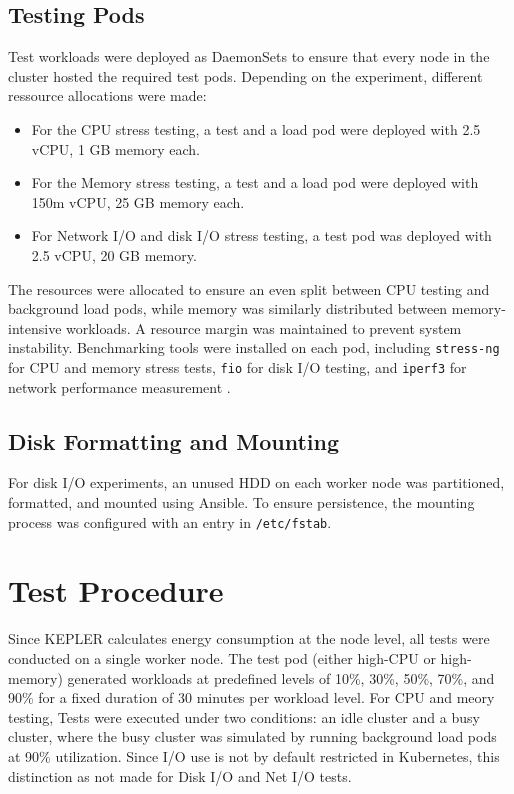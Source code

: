 \subsection{Testing Pods}
Test workloads were deployed as DaemonSets to ensure that every node in the cluster hosted the required test pods. Depending on the experiment, different ressource allocations were made:
\begin{itemize}
    \item For the CPU stress testing, a test and a load pod were deployed with 2.5 vCPU, 1 GB memory each.
    \item For the Memory stress testing, a test and a load pod were deployed with 150m vCPU, 25 GB memory each.
    \item For Network I/O and disk I/O stress testing, a test pod was deployed with 2.5 vCPU, 20 GB memory.
\end{itemize}
The resources were allocated to ensure an even split between CPU testing and background load pods, while memory was similarly distributed between memory-intensive workloads. A resource margin was maintained to prevent system instability. Benchmarking tools were installed on each pod, including \texttt{stress-ng}\parencite{stress-ng} for CPU and memory stress tests, \texttt{fio}\parencite{fio} for disk I/O testing, and \texttt{iperf3}\parencite{iperf3} for network performance measurement .

\subsection{Disk Formatting and Mounting}
For disk I/O experiments, an unused HDD on each worker node was partitioned, formatted, and mounted using Ansible. To ensure persistence, the mounting process was configured with an entry in \texttt{/etc/fstab}.

\section{Test Procedure}
Since KEPLER calculates energy consumption at the node level, all tests were conducted on a single worker node. The test pod (either high-CPU or high-memory) generated workloads at predefined levels of 10\%, 30\%, 50\%, 70\%, and 90\% for a fixed duration of 30 minutes per workload level. For CPU and meory testing, Tests were executed under two conditions: an idle cluster and a busy cluster, where the busy cluster was simulated by running background load pods at 90\% utilization. Since I/O use is not by default restricted in Kubernetes, this distinction as not made for Disk I/O and Net I/O tests.

